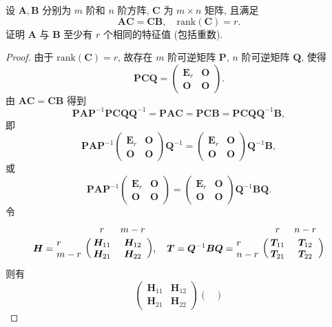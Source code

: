 \documentclass[../../main.tex]{subfiles}
\begin{document}
\begin{example}
设 $\boldsymbol{A},\boldsymbol{B}$ 分别为 $m$ 阶和 $n$ 阶方阵, $\boldsymbol{C}$ 为 $m \times n$ 矩阵, 且满足
\[
\boldsymbol{AC} = \boldsymbol{CB}, \quad \mathrm{rank}(\boldsymbol{C}) = r.
\]
证明 $\boldsymbol{A}$ 与 $\boldsymbol{B}$ 至少有 $r$ 个相同的特征值 (包括重数).
\end{example}
\begin{proof}
由于 $\mathrm{rank}(\boldsymbol{C}) = r$, 故存在 $m$ 阶可逆矩阵 $\boldsymbol{P}$, $n$ 阶可逆矩阵 $\boldsymbol{Q}$, 使得
\[
\boldsymbol{PCQ} = \begin{pmatrix} 
\boldsymbol{E}_r & \boldsymbol{O} \\
\boldsymbol{O} & \boldsymbol{O} 
\end{pmatrix}.
\]
由 $\boldsymbol{AC} = \boldsymbol{CB}$ 得到
\[
\boldsymbol{PAP}^{-1}\boldsymbol{PCQQ}^{-1} = \boldsymbol{PAC} = \boldsymbol{PCB} = \boldsymbol{PCQQ}^{-1}\boldsymbol{B},
\]
即
\[
\boldsymbol{PAP}^{-1} \begin{pmatrix} 
\boldsymbol{E}_r & \boldsymbol{O} \\
\boldsymbol{O} & \boldsymbol{O} 
\end{pmatrix} \boldsymbol{Q}^{-1} = \begin{pmatrix} 
\boldsymbol{E}_r & \boldsymbol{O} \\
\boldsymbol{O} & \boldsymbol{O} 
\end{pmatrix} \boldsymbol{Q}^{-1}\boldsymbol{B},
\]
或
\[
\boldsymbol{PAP}^{-1} \begin{pmatrix} 
\boldsymbol{E}_r & \boldsymbol{O} \\
\boldsymbol{O} & \boldsymbol{O} 
\end{pmatrix} = \begin{pmatrix} 
\boldsymbol{E}_r & \boldsymbol{O} \\
\boldsymbol{O} & \boldsymbol{O} 
\end{pmatrix} \boldsymbol{Q}^{-1}\boldsymbol{BQ}.
\]
令
\[
\boldsymbol{H} = \bordermatrix{%
& r & m-r \cr
r & \boldsymbol{H}_{11}& \boldsymbol{H}_{12}  \cr
m-r & \boldsymbol{H}_{21}& \boldsymbol{H}_{22}  \cr
}, \quad \boldsymbol{T} = \boldsymbol{Q}^{-1}\boldsymbol{BQ} = \bordermatrix{%
& r & n-r \cr
r & \boldsymbol{T}_{11}& \boldsymbol{T}_{12}  \cr
n-r & \boldsymbol{T}_{21}& \boldsymbol{T}_{22}  \cr
}
\]
则有
\[
\begin{pmatrix} 
\boldsymbol{H}_{11} & \boldsymbol{H}_{12} \\
\boldsymbol{H}_{21} & \boldsymbol{H}_{22} 
\end{pmatrix} \begin{pmatrix} 

\end{pmatrix}\]
\end{proof}
\end{document}
